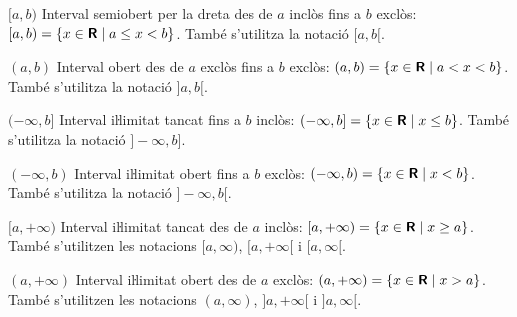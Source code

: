 \begin{list}{}
     \item[{$[a,b)$}] Interval semiobert per la dreta des de $a$ inclòs fins a $b$ exclòs: $[a,b) = \{x \in {\ensuremath{\boldsymbol{\mathsf{R}}}} \mid a \leq x < b\}$. També s'utilitza la notació $[a,b[$.
     \item[{$(a,b)$}] Interval obert des de $a$ exclòs fins a $b$ exclòs: $(a,b) = \{x \in {\ensuremath{\boldsymbol{\mathsf{R}}}} \mid a < x < b\}$. També s'utilitza la notació $]a,b[$.
     \item[{$(-\infty,b]$}] Interval iŀlimitat tancat fins a $b$ inclòs: $(-\infty,b] = \{x \in {\ensuremath{\boldsymbol{\mathsf{R}}}} \mid x \leq b\}$.  També s'utilitza la notació $]-\infty,b]$.
     \item[{$(-\infty,b)$}] Interval iŀlimitat obert fins a $b$ exclòs: $(-\infty,b) = \{x \in {\ensuremath{\boldsymbol{\mathsf{R}}}} \mid x < b\}$. També s'utilitza la notació $]-\infty,b[$.
     \item[{$[a,+\infty)$}] Interval iŀlimitat tancat des de $a$ inclòs: $[a, +\infty) = \{x \in {\ensuremath{\boldsymbol{\mathsf{R}}}} \mid  x \geq a\}$. També s'utilitzen les notacions $[a, \infty)$, $[a, +\infty[$ i $[a, \infty[$.
	 \item[{$(a,+\infty)$}] Interval iŀlimitat obert des de $a$ exclòs: $(a, +\infty) = \{x \in {\ensuremath{\boldsymbol{\mathsf{R}}}} \mid  x > a\}$. També s'utilitzen les notacions $(a, \infty)$, $]a, +\infty[$ i $]a, \infty[$.
\end{list}
 
 
 
 
 
 
 
 
 
 
